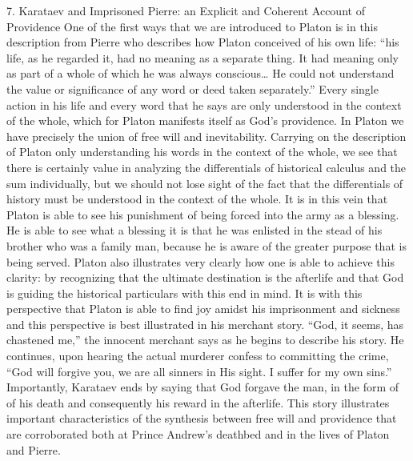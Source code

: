 7. Karataev and Imprisoned Pierre: an Explicit and Coherent Account of Providence
One of the first ways that we are introduced to Platon is in this description from Pierre who describes how Platon conceived of his own life: “his life, as he regarded it, had no meaning as a separate thing. It had meaning only as part of a whole of which he was always conscious… He could not understand the value or significance of any word or deed taken separately.” Every single action in his life and every word that he says are only understood in the context of the whole, which for Platon manifests itself as God’s providence. In Platon we have precisely the union of free will and inevitability.  Carrying on the description of Platon only understanding his words in the context of the whole, we see that there is certainly value in analyzing the differentials of historical calculus and the sum individually, but we should not lose sight of the fact that the differentials of history must be understood in the context of the whole. It is in this vein that Platon is able to see his punishment of being forced into the army as a blessing. He is able to see what a blessing it is that he was enlisted in the stead of his brother who was a family man, because he is aware of the greater purpose that is being served. Platon also illustrates very clearly how one is able to achieve this clarity: by recognizing that the ultimate destination is the afterlife and that God is guiding the historical particulars with this end in mind. It is with this perspective that Platon is able to find joy amidst his imprisonment and sickness and this perspective is best illustrated in his merchant story. 
 “God, it seems, has chastened me,” the innocent merchant says as he begins to describe his story.  He continues, upon hearing the actual murderer confess to committing the crime, “God will forgive you, we are all sinners in His sight. I  suffer for my own sins.”  Importantly, Karataev ends by saying that God forgave the man, in the form of of his death and consequently his reward in the afterlife. This story illustrates important characteristics of the synthesis between free will and providence that are corroborated both at Prince Andrew’s deathbed and in the lives of Platon and Pierre. 
